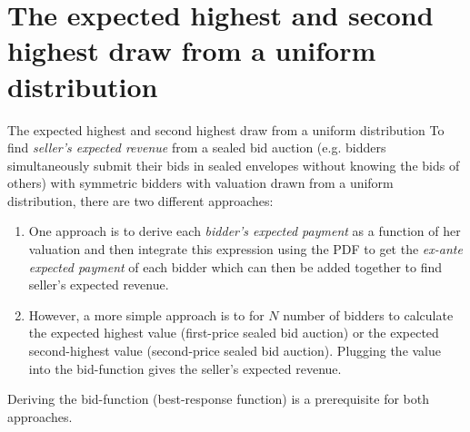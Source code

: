 \section{The expected highest and second highest draw from a uniform distribution}

\begin{frame}{The expected highest and second highest draw from a uniform distribution}
    To find \textit{seller's expected revenue} from a sealed bid auction (e.g. bidders simultaneously submit their bids in sealed envelopes without knowing the bids of others) with symmetric bidders with valuation drawn from a uniform distribution, there are two different approaches:
    \begin{enumerate}
      \item One approach is to derive each \textit{bidder's expected payment} as a function of her valuation and then integrate this expression using the PDF to get the \textit{ex-ante expected payment} of each bidder which can then be added together to find seller's expected revenue.
      \item However, a more simple approach is to for $N$ number of bidders to calculate the expected highest value (first-price sealed bid auction) or the expected second-highest value (second-price sealed bid auction). Plugging the value into the bid-function gives the seller's expected revenue.
    \end{enumerate}
    Deriving the bid-function (best-response function) is a prerequisite for both approaches.
\end{frame}

